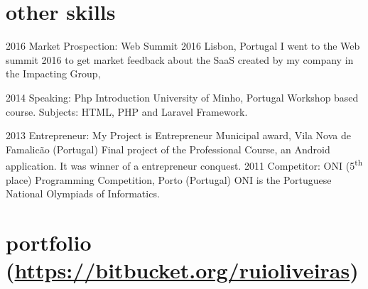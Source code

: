 \documentclass[]{friggeri-cv} %
\begin{document}
\section{other skills}
\begin{entrylist}
\entry
{2016}
{Market Prospection: Web Summit 2016}
{Lisbon, Portugal}
{
 I went to the Web summit 2016 to get market feedback about the SaaS created by my company in the Impacting Group, 
}

\entry
{2014}
{Speaking: Php Introduction}
{University of Minho, Portugal}
{Workshop based course. Subjects: HTML, PHP and Laravel Framework.}

\entry
{2013}
{Entrepreneur: My Project is Entrepreneur}
{Municipal award, Vila Nova de Famalicão (Portugal)}
{Final project of the Professional Course, an Android application. It was winner of a entrepreneur conquest. }
\entry
{2011}
{Competitor: ONI (5\textsuperscript{th} place)}
{Programming Competition, Porto (Portugal)}
{ONI is the Portuguese National Olympiads of Informatics.}

\end{entrylist}



\section{portfolio {\normalfont \normalsize (\href{https://bitbucket.org/ruioliveiras}{https://bitbucket.org/ruioliveiras})}}
\end{document}
